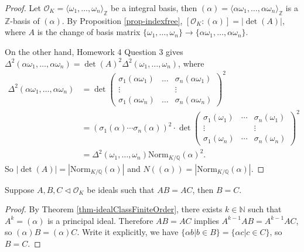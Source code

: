 \begin{proof}
    Let $\mathcal{O}_{K}=\langle \omega_{1},\dots,\omega_{n}\rangle_{\mathbb{Z}}$ be a integral basis, then $(\alpha)=\langle \alpha\omega_{1},\dots, \alpha\omega_{n}\rangle_{\mathbb{Z}}$ is a $\mathbb{Z}$-basis of $(\alpha)$. 
    By Proposition \ref{prop-indexfree}, $[\mathcal{O}_{K}:(\alpha)]=|\det(A)|$, where $A$ is the change of basis matrix $\{\omega_{1},\dots, \omega_{n}\}\to \{\alpha\omega_{1},\dots,\alpha\omega_{n}\}$. 
    
    
    
    On the other hand, Homework 4 Question 3 gives $\Delta^{2}(\alpha\omega_{1},\dots,\alpha\omega_{n})=\det(A)^{2}\Delta^{2}(\omega_{1},\dots,\omega_{n})$, where
    \[
    \begin{aligned}
        \Delta^{2}(\alpha\omega_{1},\dots,\alpha\omega_{n})&=\det\begin{pmatrix}
            \sigma_{1}(\alpha \omega_{1})&\dots &\sigma_{n}(\alpha\omega_{1})\\
            \vdots&&\vdots\\
            \sigma_{1}(\alpha \omega_{n})&\dots &\sigma_{n}(\alpha\omega_{n})
        \end{pmatrix}^{2}\\
        &=(\sigma_{1}(\alpha)\cdots \sigma_{n}(\alpha))^{2}\cdot \det \begin{pmatrix}
            \sigma_{1}(\omega_{1})&\cdots&\sigma_{n}(\omega_{1})\\
            \vdots && \vdots\\
            \sigma_{1}(\omega_{n})&\cdots&\sigma_{n}(\omega_{n})
        \end{pmatrix}^{2}\\
        &=\Delta^{2}(\omega_{1},\dots,\omega_{n})\mathrm{Norm}_{K /\mathbb{Q}}(\alpha)^{2}. 
    \end{aligned}
    \]
    So $|\det(A)|=\left| \mathrm{Norm}_{K /\mathbb{Q}}(\alpha) \right| $ and $N((\alpha))=|\mathrm{Norm}_{K /\mathbb{Q}}(\alpha)|$. 
\end{proof}

\begin{lemma}
    Suppose $A,B,C\lhd \mathcal{O}_{K}$ be ideals such that $AB=AC$, then $B=C$. 
\end{lemma}

\begin{proof}
    By Theorem \ref{thm-idealClassFiniteOrder}, there exists $k\in \mathbb{N}$ such that $A^{k}=(\alpha)$ is a principal ideal. Therefore $AB=AC$ implies $A^{k-1}AB=A^{k-1}AC$, so $(\alpha)B=(\alpha)C$. Write it explicitly, we have $\{\alpha b|b\in B\}=\{\alpha c|c\in C\}$, so $B=C$.  
\end{proof}

